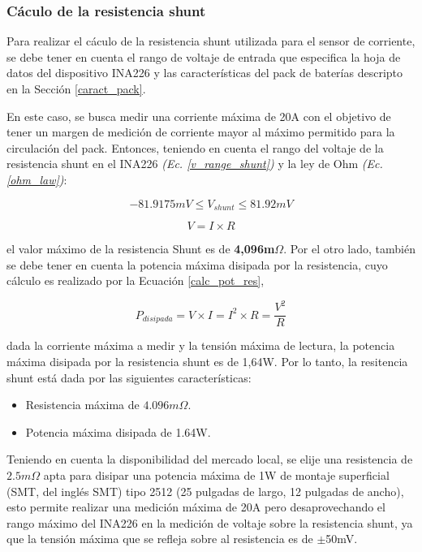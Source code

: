 \documentclass[10pt,a4paper]{article}
\begin{document}
\newpage

\subsubsection{C\'aculo de la resistencia shunt}

Para realizar el c\'aculo de la resistencia shunt utilizada para el sensor de
corriente, se debe tener en cuenta el rango de voltaje de entrada que
especifica la hoja de datos del dispositivo INA226 y las caracter\'isticas del
pack de bater\'ias descripto en la Secci\'on \ref{caract_pack}. 

En este caso, se busca medir una corriente m\'axima de 20A con el objetivo de
tener un margen de medici\'on de corriente mayor al m\'aximo permitido para la
circulaci\'on del pack. Entonces, teniendo en cuenta el rango del voltaje de
la resistencia shunt en el INA226 \emph{(Ec. \ref{v_range_shunt})} y la ley de
Ohm \emph{(Ec. \ref{ohm_law})}:

\begin{equation}
    -81.9175mV \le V_{shunt} \le 81.92mV  \label{v_range_shunt}
\end{equation}

\begin{equation}
    V=I \times R \label{ohm_law}
\end{equation}

el valor m\'aximo de la resistencia Shunt es de \textbf{4,096m$\Omega$}. Por el
otro lado, tambi\'en se debe tener en cuenta la potencia m\'axima disipada por
la resistencia, cuyo c\'alculo es realizado por la Ecuaci\'on 
\ref{calc_pot_res},

\begin{equation}
    P_{disipada} = V \times I = I^2 \times R = \frac{V^2}{R} \label{calc_pot_res}
\end{equation}

dada la corriente m\'axima a medir y la tensi\'on m\'axima de lectura, la
potencia m\'axima disipada por la resistencia shunt es de 1,64W. Por lo tanto,
la resitencia shunt est\'a dada por las siguientes caracter\'isticas:

\begin{itemize}
    \item Resistencia m\'axima de $4.096m\Omega$.
    \item Potencia m\'axima disipada de 1.64W.
\end{itemize}

Teniendo en cuenta la disponibilidad del mercado local, se elije una resistencia 
de $2.5m\Omega$ apta para disipar una potencia m\'axima de 1W de montaje
superficial (\acrshort{SMT}, del ingl\'es \acrlong{SMT}) tipo 2512 
(25 pulgadas de largo, 12 pulgadas de ancho), esto permite realizar una
medici\'on m\'axima de 20A pero desaprovechando el rango m\'aximo del INA226 en
la medici\'on de voltaje sobre la resistencia shunt, ya que la tensi\'on
m\'axima que se refleja sobre al resistencia es de $\mathrm{\pm}$50mV.
\end{document}
